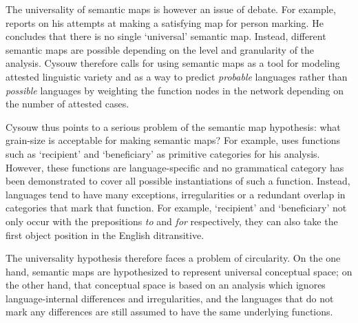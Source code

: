 The universality of semantic maps is however an issue of debate. For example, \citet{cysouw08building} reports on his attempts at making a satisfying map for person marking. He concludes that there is no single `universal' semantic map. Instead, different semantic maps are possible depending on the level and granularity of the analysis. Cysouw therefore calls for using semantic maps as a tool for modeling attested linguistic variety and as a way to predict {\em probable} languages rather than {\em possible} languages by weighting the function nodes in the network depending on the number of attested cases.

Cysouw thus points to a serious problem of the semantic map hypothesis: what grain-size is acceptable for making semantic maps? For example, \citet{haspelmath03geometry} uses functions such as `recipient' and `beneficiary' as primitive categories for his analysis. However, these functions are language-specific and no grammatical category has been demonstrated to cover all possible instantiations of such a function. Instead, languages tend to have many exceptions, irregularities or a redundant overlap in categories that mark that function. For example, `recipient' and `beneficiary' not only occur with the prepositions {\em to} and {\em for} respectively, they can also take the first object position in the English ditransitive.

The universality hypothesis therefore faces a problem of circularity. On the one hand, semantic maps are hypothesized to represent universal conceptual space; on the other hand, that conceptual space is based on an analysis which ignores language-internal differences and irregularities, and the languages that do not mark any differences are still assumed to have the same underlying functions.

